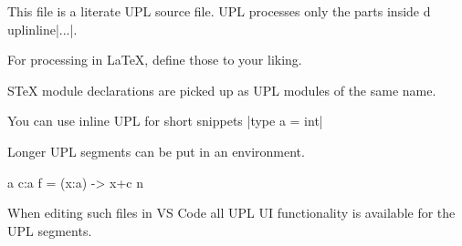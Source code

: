 \documentclass{stex}
\begin{document}
This file is a literate UPL source file.
UPL processes only the parts inside \newenvironment{upl} and uplinline|...|.

For processing in LaTeX, define those to your liking.

STeX module declarations are picked up as UPL modules of the same name.
\begin{smodule}[id=LatexExample]

  You can use inline UPL for short snippets
  \uplinline|type a = int|
 
  Longer UPL segments can be put in an environment.

  \begin{upl}
  c:a
  f = (x:a) -> x+c
  \end{upl}

When editing such files in VS Code all UPL UI functionality is available for the UPL segments.

\end{smodule}
\end{document}
